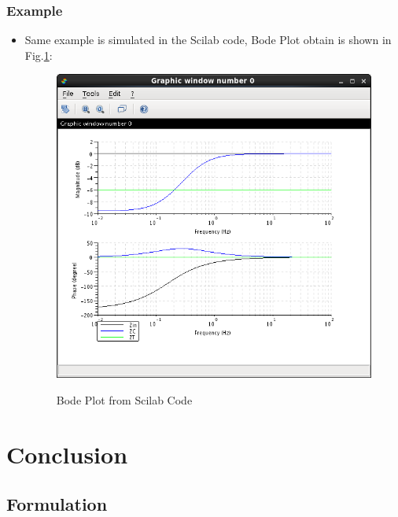\documentclass{beamer}
\begin{document}
\begin{frame}
\frametitle{Example}

\begin{small}
        \begin{itemize}
	\item Same example is simulated in the Scilab code, Bode Plot obtain is shown in Fig.\ref{be}:
\begin{figure}[h!]
\centering
{\label{method}\includegraphics[scale=0.3]{images/bodeEX.png}}
\caption{Bode Plot from Scilab Code}
\label{be}
\end{figure} 

         \end{itemize}
\end{small}


\end{frame}




\section{Conclusion}
\subsection*{Formulation}
\end{document}

